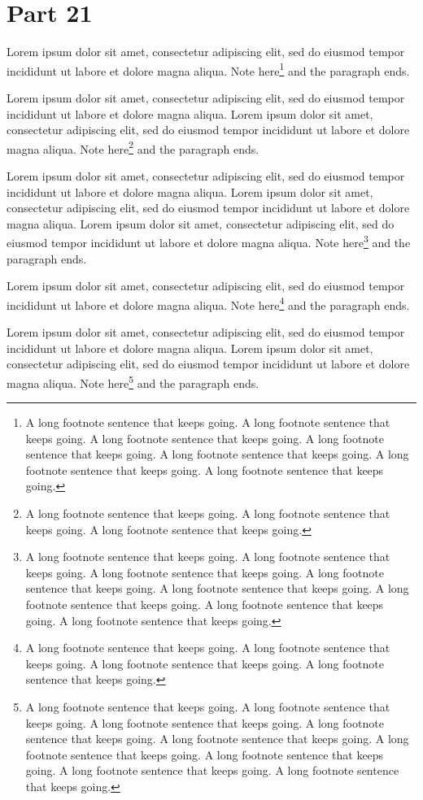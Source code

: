 \documentclass{article}
\begin{document}
\section{Part 21}
Lorem ipsum dolor sit amet, consectetur adipiscing elit, sed do eiusmod tempor incididunt ut labore et dolore magna aliqua. Note here\footnote{A long footnote sentence that keeps going. A long footnote sentence that keeps going. A long footnote sentence that keeps going. A long footnote sentence that keeps going. A long footnote sentence that keeps going. A long footnote sentence that keeps going. A long footnote sentence that keeps going. } and the paragraph ends.

Lorem ipsum dolor sit amet, consectetur adipiscing elit, sed do eiusmod tempor incididunt ut labore et dolore magna aliqua. Lorem ipsum dolor sit amet, consectetur adipiscing elit, sed do eiusmod tempor incididunt ut labore et dolore magna aliqua. Note here\footnote{A long footnote sentence that keeps going. A long footnote sentence that keeps going. A long footnote sentence that keeps going. } and the paragraph ends.

Lorem ipsum dolor sit amet, consectetur adipiscing elit, sed do eiusmod tempor incididunt ut labore et dolore magna aliqua. Lorem ipsum dolor sit amet, consectetur adipiscing elit, sed do eiusmod tempor incididunt ut labore et dolore magna aliqua. Lorem ipsum dolor sit amet, consectetur adipiscing elit, sed do eiusmod tempor incididunt ut labore et dolore magna aliqua. Note here\footnote{A long footnote sentence that keeps going. A long footnote sentence that keeps going. A long footnote sentence that keeps going. A long footnote sentence that keeps going. A long footnote sentence that keeps going. A long footnote sentence that keeps going. A long footnote sentence that keeps going. A long footnote sentence that keeps going. } and the paragraph ends.

Lorem ipsum dolor sit amet, consectetur adipiscing elit, sed do eiusmod tempor incididunt ut labore et dolore magna aliqua. Note here\footnote{A long footnote sentence that keeps going. A long footnote sentence that keeps going. A long footnote sentence that keeps going. A long footnote sentence that keeps going. } and the paragraph ends.

Lorem ipsum dolor sit amet, consectetur adipiscing elit, sed do eiusmod tempor incididunt ut labore et dolore magna aliqua. Lorem ipsum dolor sit amet, consectetur adipiscing elit, sed do eiusmod tempor incididunt ut labore et dolore magna aliqua. Note here\footnote{A long footnote sentence that keeps going. A long footnote sentence that keeps going. A long footnote sentence that keeps going. A long footnote sentence that keeps going. A long footnote sentence that keeps going. A long footnote sentence that keeps going. A long footnote sentence that keeps going. A long footnote sentence that keeps going. A long footnote sentence that keeps going. } and the paragraph ends.
\end{document}
